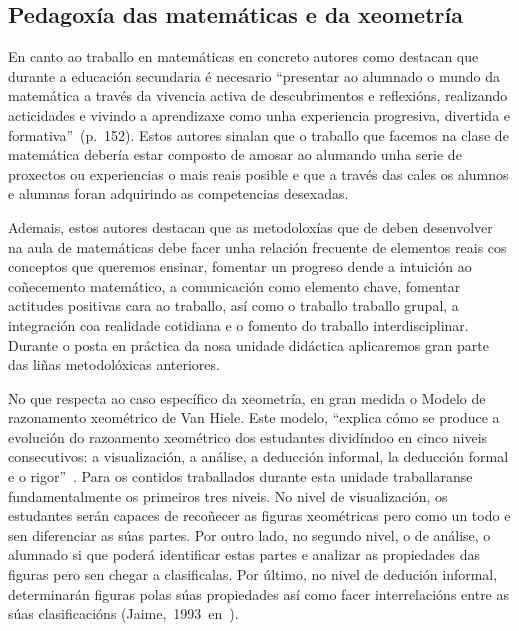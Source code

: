 \subsection{Pedagoxía das matemáticas e da xeometría}
En canto ao traballo en matemáticas en concreto autores como  destacan que durante a educación secundaria é necesario ``presentar ao alumnado o mundo da matemática a través da vivencia activa de descubrimentos e reflexións, realizando acticidades e vivindo a aprendizaxe como unha experiencia progresiva, divertida e formativa''~(p.~152). Estos autores sinalan que o traballo que facemos na clase de matemática debería estar composto de amosar ao alumando unha serie de proxectos ou experiencias o mais reais posible e que a través das cales os alumnos e alumnas foran adquirindo as competencias desexadas.

Ademais, estos autores destacan que as metodoloxías que de deben  desenvolver na aula de matemáticas debe facer unha relación frecuente de elementos reais cos conceptos que queremos ensinar, fomentar un progreso dende a intuición ao coñecemento matemático, a comunicación como elemento chave, fomentar actitudes positivas cara ao traballo, así como o traballo traballo grupal, a integración coa realidade cotidiana e o fomento do traballo interdisciplinar. Durante o posta en práctica da nosa unidade didáctica aplicaremos gran parte das liñas metodolóxicas anteriores.

No que respecta ao caso específico da xeometría, en gran medida o Modelo de razonamento xeométrico de Van Hiele. Este modelo, ``explica cómo se produce a evolución do
razoamento xeométrico dos estudantes dividíndoo en cinco niveis consecutivos: a visualización, a análise, a deducción informal, la deducción formal e o rigor''~\cite[p.~81]{vargas2013modelo}. Para os contidos traballados durante esta unidade traballaranse fundamentalmente os primeiros tres niveis. No nivel de visualización, os estudantes serán capaces de recoñecer as figuras xeométricas pero como un todo e sen diferenciar as súas partes. Por outro lado, no segundo nivel, o de análise, o alumnado si que poderá identificar estas partes e analizar as propiedades das figuras pero sen chegar a clasificalas. Por último, no nivel de dedución informal, determinarán figuras polas súas propiedades así como facer interrelacións entre as súas clasificacións (Jaime,~1993~en~).

